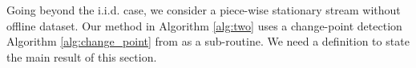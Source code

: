 

Going beyond the  i.i.d. case, we consider a piece-wise stationary stream without offline dataset.
Our method in Algorithm \ref{alg:two} uses a change-point detection Algorithm \ref{alg:change_point} from \cite{shekhar2023sequential} as a sub-routine. We need a  definition to state the main result of this section. %


